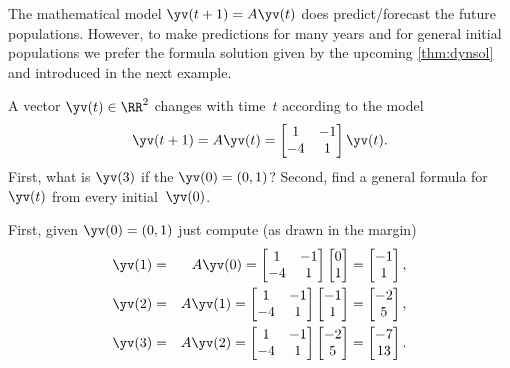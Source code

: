 The mathematical model \(\yv(t+1)=A\yv(t)\) does predict\slash forecast the future populations.
However, to make predictions for many years and for general initial populations we prefer the formula solution given by the upcoming \autoref{thm:dynsol} and introduced in the next example.





\begin{example} \label{eg:2x2map}
A vector \(\yv(t)\in\RR^2\) changes with time~\(t\) according to the model
\begin{equation*}
\yv(t+1)=A\yv(t)=\begin{bmatrix} 1&-1\\-4&1 \end{bmatrix}\yv(t).
\end{equation*}
First, what is \(\yv(3)\) if the  \(\yv(0)=(0,1)\)?
Second, find a general formula for~\(\yv(t)\) from every initial~\(\yv(0)\).
\begin{solution} 
First, given \(\yv(0)=(0,1)\) just compute (as drawn in the margin)
%
\begin{eqnarray*}
\yv(1)&=&A\yv(0)=\begin{bmatrix} 1&-1\\-4&1 \end{bmatrix}
\begin{bmatrix} 0\\1 \end{bmatrix}
=\begin{bmatrix} -1\\1 \end{bmatrix},
\\\yv(2)&=&A\yv(1)=\begin{bmatrix} 1&-1\\-4&1 \end{bmatrix}
\begin{bmatrix} -1\\1 \end{bmatrix}
=\begin{bmatrix} -2\\5 \end{bmatrix},
\\\yv(3)&=&A\yv(2)=\begin{bmatrix} 1&-1\\-4&1 \end{bmatrix}
\begin{bmatrix} -2\\5 \end{bmatrix}
=\begin{bmatrix} -7\\13 \end{bmatrix}.
\end{eqnarray*}



\end{solution}
\end{example}
